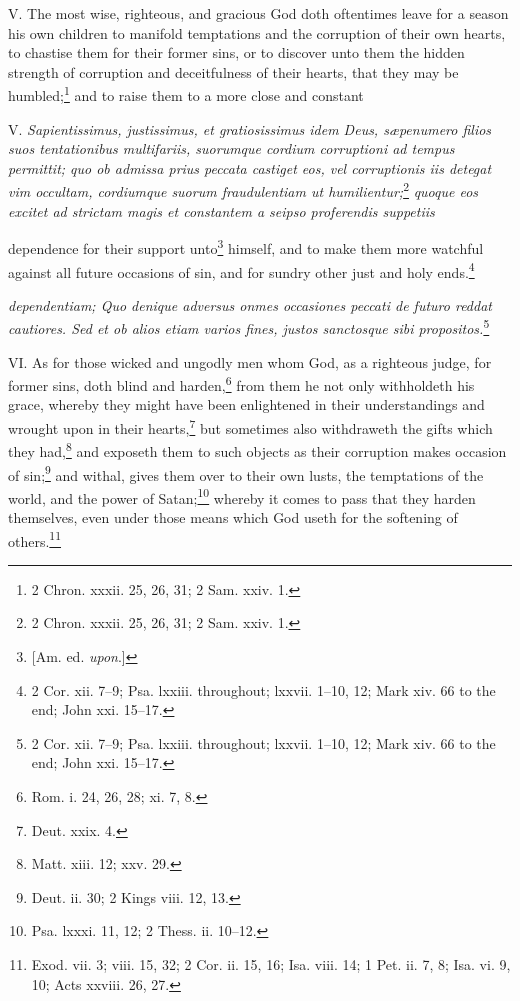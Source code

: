 V. The most wise, righteous, and gracious God doth oftentimes leave for a season his own children to manifold temptations and the corruption of their own hearts, to chastise them for their former sins, or to discover unto them the hidden strength of corruption and deceitfulness of their hearts, that they may be humbled;\footnote{2 Chron. xxxii. 25, 26, 31; 2 Sam. xxiv. 1.} and to raise them to a more close and constant

V. \emph{Sapientissimus, justissimus, et gratiosissimus idem Deus, sæpenumero filios suos tentationibus multifariis, suorumque cordium corruptioni ad tempus permittit; quo ob admissa prius peccata castiget eos, vel corruptionis iis detegat vim occultam, cordiumque suorum fraudulentiam ut humilientur;}\footnote{2 Chron. xxxii. 25, 26, 31; 2 Sam. xxiv. 1.}\emph{ quoque eos excitet ad strictam magis et constantem a seipso proferendis suppetiis }

dependence for their support unto\footnote{[Am. ed. \emph{upon}.]} himself, and to make them more watchful against all future occasions of sin, and for sundry other just and holy ends.\footnote{2 Cor. xii. 7–9; Psa. lxxiii. throughout; lxxvii. 1–10, 12; Mark xiv. 66 to the end; John xxi. 15–17.}

\emph{dependentiam; Quo denique adversus onmes occasiones peccati de futuro reddat cautiores. Sed et ob alios etiam varios fines, justos sanctosque sibi propositos.}\footnote{2 Cor. xii. 7–9; Psa. lxxiii. throughout; lxxvii. 1–10, 12; Mark xiv. 66 to the end; John xxi. 15–17.}

VI. As for those wicked and ungodly men whom God, as a righteous judge, for former sins, doth blind and harden,\footnote{Rom. i. 24, 26, 28; xi. 7, 8.} from them he not only withholdeth his grace, whereby they might have been enlightened in their understandings and wrought upon in their hearts,\footnote{Deut. xxix. 4.} but sometimes also withdraweth the gifts which they had,\footnote{Matt. xiii. 12; xxv. 29.} and exposeth them to such objects as their corruption makes occasion of sin;\footnote{Deut. ii. 30; 2 Kings viii. 12, 13.} and withal, gives them over to their own lusts, the temptations of the world, and the power of Satan;\footnote{Psa. lxxxi. 11, 12; 2 Thess. ii. 10–12.} whereby it comes to pass that they harden themselves, even under those means which God useth for the softening of others.\footnote{Exod. vii. 3; viii. 15, 32; 2 Cor. ii. 15, 16; Isa. viii. 14; 1 Pet. ii. 7, 8; Isa. vi. 9, 10; Acts xxviii. 26, 27.}

